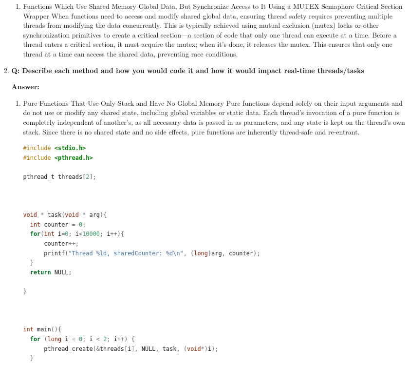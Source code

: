 \documentclass[a4paper,11pt]{article}%
\newenvironment{qanda}{\setlength{\parindent}{0pt}}{\bigskip}
\newcommand{\Q}{\bigskip\bfseries Q: }
\newcommand{\A}{\par\textbf{Answer: } \normalfont}
\begin{document}
\begin{qanda}
\begin{enumerate}
\begin{enumerate}
\begin{enumerate}
					      \item Functions Which Use Shared Memory Global Data, But Synchronize Access to It Using a MUTEX Semaphore Critical Section Wrapper
					            When functions need to access and modify shared global data, ensuring thread safety requires preventing multiple threads from modifying the data concurrently. This is typically achieved using mutual exclusion (mutex) locks or other synchronization primitives to create a critical section—a section of code that only one thread can execute at a time. Before a thread enters a critical section, it must acquire the mutex; when it's done, it releases the mutex. This ensures that only one thread at a time can access the shared data, preventing race conditions.

				      \end{enumerate}




				\item \Q Describe each method and how you would code it and how it would impact real-time
				      threads/tasks
				      \A

				      \begin{enumerate}
					      \item Pure Functions That Use Only Stack and Have No Global Memory
					            Pure functions depend solely on their input arguments and do not use or modify any shared state, including global variables or static data. Each thread's invocation of a pure function is completely independent of another's, as all necessary data is passed in as parameters, and any state is kept on the thread's own stack. Since there is no shared state and no side effects, pure functions are inherently thread-safe and re-entrant.
					            \begin{lstlisting}[language=C]
#include <stdio.h>
#include <pthread.h>

pthread_t threads[2];



void * task(void * arg){
  int counter = 0;
  for(int i=0; i<10000; i++){
	  counter++;
	  printf("Thread %ld, sharedCounter: %d\n", (long)arg, counter);
  }
  return NULL;

}



int main(){
  for (long i = 0; i < 2; i++) {
	  pthread_create(&threads[i], NULL, task, (void*)i);
  }


\end{lstlisting}
\end{enumerate}
\end{enumerate}
\end{enumerate}
\end{qanda}
\end{document}
